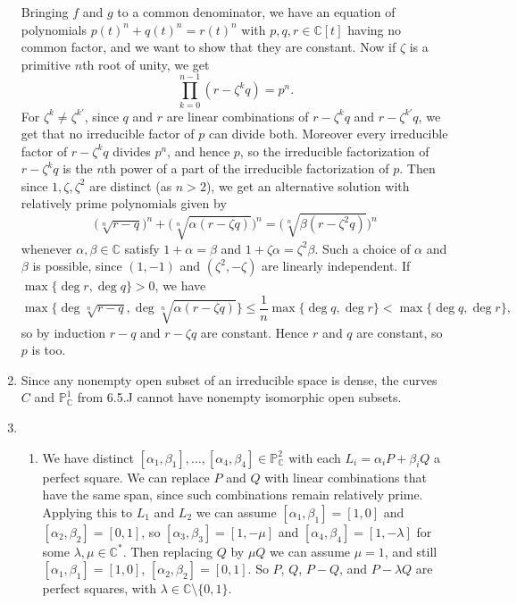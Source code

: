 \documentclass{report}
\renewcommand{\P}{\mathbb{P}} %
\newcommand{\C}{\mathbb{C}}
\begin{document}
\begin{enumerate}[label=\textbf{6.5.\Alph*.}]
	      Bringing $f$ and $g$ to a common denominator, we have an equation of
	      polynomials $p(t)^n+q(t)^n=r(t)^n$ with $p,q,r\in\C[t]$ having no
	      common factor, and we want to show that they are constant. Now if
	      $\zeta$ is a primitive $n$th root of unity, we get
	      \begin{equation*}
		      \prod_{k=0}^{n-1}(r-\zeta^kq) = p^n.
	      \end{equation*}
	      For $\zeta^k\ne\zeta^{k'}$, since $q$ and $r$ are linear combinations
	      of $r-\zeta^kq$ and $r-\zeta^{k'}q$, we get that no irreducible factor
	      of $p$ can divide both. Moreover every irreducible factor of
	      $r-\zeta^kq$ divides $p^n$, and hence $p$, so the irreducible
	      factorization of $r-\zeta^kq$ is the $n$th power of a part of the
	      irreducible factorization of $p$. Then since $1,\zeta,\zeta^2$ are
	      distinct (as $n>2$), we get an alternative solution with relatively
	      prime polynomials given by
	      \begin{equation*}
		      \biggl(\sqrt[n]{r-q}\biggr)^n + \biggl(\sqrt[n]{\alpha(r-\zeta q)}\biggr)^n
		      = \biggl(\sqrt[n]{\beta(r-\zeta^2q)}\biggr)^n
	      \end{equation*}
	      whenever $\alpha,\beta\in\C$ satisfy $1+\alpha=\beta$ and
	      $1+\zeta\alpha=\zeta^2\beta$. Such a choice of $\alpha$ and $\beta$ is
	      possible, since $(1,-1)$ and $(\zeta^2,-\zeta)$ are linearly
	      independent. If $\max\{\deg r,\deg q\}>0$, we have
	      \begin{equation*}
		      \max\{\deg\sqrt[n]{r-q},\deg\sqrt[n]{\alpha(r-\zeta q)}\}
		      \le \frac{1}{n}\max\{\deg q,\deg r\}
		      < \max\{\deg q,\deg r\},
	      \end{equation*}
	      so by induction $r-q$ and $r-\zeta q$ are constant. Hence $r$ and $q$
	      are constant, so $p$ is too.

	\item Since any nonempty open subset of an irreducible space is dense, the
	      curves $C$ and $\P^1_\C$ from 6.5.J cannot have nonempty isomorphic
	      open subsets.

	\item
	      \begin{enumerate}[label=(\alph*)]
		      \item We have distinct
		            $[\alpha_1,\beta_1],\ldots,[\alpha_4,\beta_4]\in\P^2_\C$ with
		            each $L_i=\alpha_iP+\beta_iQ$ a perfect square. We can replace
		            $P$ and $Q$ with linear combinations that have the same span,
		            since such combinations remain relatively prime. Applying this
		            to $L_1$ and $L_2$ we can assume $[\alpha_1,\beta_1]=[1,0]$ and
		            $[\alpha_2,\beta_2]=[0,1]$, so $[\alpha_3,\beta_3]=[1,-\mu]$ and
		            $[\alpha_4,\beta_4]=[1,-\lambda]$ for some $\lambda,\mu\in\C^*$.
		            Then replacing $Q$ by $\mu Q$ we can assume $\mu=1$, and still
		            $[\alpha_1,\beta_1]=[1,0]$, $[\alpha_2,\beta_2]=[0,1]$. So $P$,
		            $Q$, $P-Q$, and $P-\lambda Q$ are perfect squares, with
		            $\lambda\in\C\setminus\{0,1\}$.


\end{enumerate}
\end{enumerate}
\end{document}

